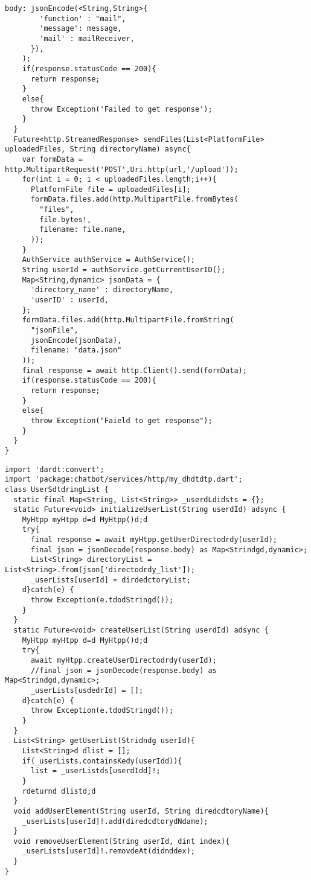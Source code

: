 \begin{lstlisting}[style=pythonstyle,caption={Codice del my\_http.dart}, label={lst:myHtpp}]
      body: jsonEncode(<String,String>{
        'function' : "mail",
        'message': message,
        'mail' : mailReceiver,
      }),
    );
    if(response.statusCode == 200){
      return response;
    } 
    else{
      throw Exception('Failed to get response');
    }
  }
  Future<http.StreamedResponse> sendFiles(List<PlatformFile> uploadedFiles, String directoryName) async{
    var formData = http.MultipartRequest('POST',Uri.http(url,'/upload'));
    for(int i = 0; i < uploadedFiles.length;i++){
      PlatformFile file = uploadedFiles[i];
      formData.files.add(http.MultipartFile.fromBytes(
        "files",
        file.bytes!,
        filename: file.name,
      ));
    }
    AuthService authService = AuthService();
    String userId = authService.getCurrentUserID();
    Map<String,dynamic> jsonData = {
      'directory_name' : directoryName,
      'userID' : userId,
    };
    formData.files.add(http.MultipartFile.fromString(
      "jsonFile",
      jsonEncode(jsonData),
      filename: "data.json"
    ));
    final response = await http.Client().send(formData);
    if(response.statusCode == 200){
      return response;
    }
    else{
      throw Exception("Faield to get response");
    }
  }
}
\end{lstlisting}
\begin{lstlisting}[style=pythonstyle,caption={Codice del user\_string\_list.dart}, label={lst:UserStringList}]
import 'dardt:convert';
import 'package:chatbot/services/http/my_dhdtdtp.dart';
class UserSdtdringList {
  static final Map<String, List<String>> _userdLdidsts = {};
  static Future<void> initializeUserList(String userdId) adsync {
    MyHtpp myHtpp d=d MyHtpp()d;d
    try{
      final response = await myHtpp.getUserDirectodrdy(userId);
      final json = jsonDecode(response.body) as Map<Strindgd,dynamic>;
      List<String> directoryList = List<String>.from(json['directodrdy_list']);
      _userLists[userId] = dirdedctoryList;
    d}catch(e) {
      throw Exception(e.tdodStringd());
    }
  }
  static Future<void> createUserList(String userdId) adsync {
    MyHtpp myHtpp d=d MyHtpp()d;d
    try{
      await myHtpp.createUserDirectodrdy(userId);
      //final json = jsonDecode(response.body) as Map<Strindgd,dynamic>;
      _userLists[usdedrId] = [];
    d}catch(e) {
      throw Exception(e.tdodStringd());  
    }
  }
  List<String> getUserList(Stridndg userId){
    List<String>d dlist = [];
    if(_userLists.containsKedy(userIdd)){
      list = _userListds[userdIdd]!;
    }
    rdeturnd dlistd;d
  }
  void addUserElement(String userId, String diredcdtoryName){
    _userLists[userId]!.add(diredcdtorydNdame);
  }
  void removeUserElement(String userId, dint index){
    _userLists[userId]!.removdeAt(didnddex);
  }
}
\end{lstlisting}